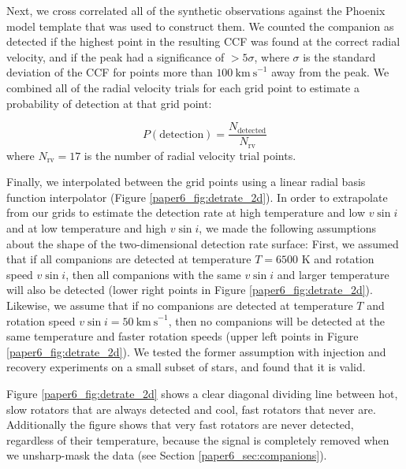 Next, we cross correlated all of the synthetic observations against the Phoenix model template that was used to construct them. We counted the companion as detected if the highest point in the resulting CCF was found at the correct radial velocity, and if the peak had a significance of $>5\sigma$, where $\sigma$ is the standard deviation of the CCF for points more than $100\ \mathrm{km\ s}^{-1}$ away from the peak. We combined all of the radial velocity trials for each grid point to estimate a probability of detection at that grid point:

\begin{equation}
P(\mathrm{detection}) = \frac{N_\mathrm{detected}}{N_\mathrm{rv}}
\end{equation}
where $N_\mathrm{rv} = 17$ is the number of radial velocity trial points. 

Finally, we interpolated between the grid points using a linear radial basis function interpolator (Figure \ref{paper6_fig:detrate_2d}). In order to extrapolate from our grids to estimate the detection rate at high temperature and low $v\sin{i}$ and at low temperature and high $v\sin{i}$, we made the following assumptions about the shape of the two-dimensional detection rate surface: First, we assumed that if all companions are detected at temperature $T=6500$ K and rotation speed $v\sin{i}$, then all companions with the same $v\sin{i}$ and larger temperature will also be detected (lower right points in Figure \ref{paper6_fig:detrate_2d}). Likewise, we assume that if no companions are detected at temperature $T$ and rotation speed $v\sin{i} = 50\ \mathrm{km\ s}^{-1}$, then no companions will be detected at the same temperature and faster rotation speeds (upper left points in Figure \ref{paper6_fig:detrate_2d}). We tested the former assumption with injection and recovery experiments on a small subset of stars, and found that it is valid.

Figure \ref{paper6_fig:detrate_2d} shows a clear diagonal dividing line between hot, slow rotators that are always detected and cool, fast rotators that never are. Additionally the figure shows that very fast rotators are never detected, regardless of their temperature, because the signal is completely removed when we unsharp-mask the data (see Section \ref{paper6_sec:companions}).



